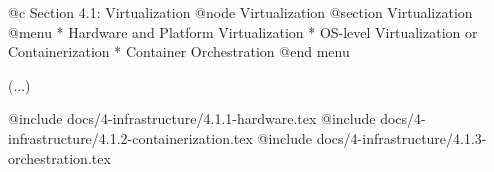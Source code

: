 @c Section 4.1: Virtualization
@node Virtualization
@section Virtualization
@menu
* Hardware and Platform Virtualization
* OS-level Virtualization or Containerization
* Container Orchestration
@end menu

(...)

@include docs/4-infrastructure/4.1.1-hardware.tex
@include docs/4-infrastructure/4.1.2-containerization.tex
@include docs/4-infrastructure/4.1.3-orchestration.tex
